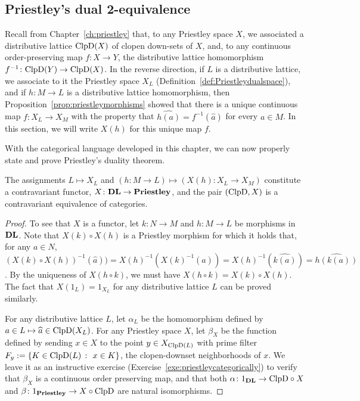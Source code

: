 \subsection*{Priestley's dual 2-equivalence}
Recall from Chapter~\ref{ch:priestley} that, to any Priestley space $X$, we associated a distributive lattice $\mathrm{ClpD}(X)$ of clopen down-sets of $X$, and, to any continuous order-preserving map $f \colon X \to Y$, the distributive lattice homomorphism $f^{-1} \colon \mathrm{ClpD}(Y) \to \mathrm{ClpD}(X)$. In the reverse direction, if $L$ is a distributive lattice, we associate to it the Priestley space $X_L$ (Definition~\ref{def:Priestleydualspace}), and if $h \colon M \to L$ is a distributive lattice homomorphism, then Proposition~\ref{prop:priestleymorphisms} showed that there is a unique continuous map $f \colon X_L \to X_M$ with the property that $\widehat{h(a)} = f^{-1}(\widehat{a})$ for every $a \in M$. In this section, we will write $X(h)$ for this unique map $f$.

With the categorical language developed in this chapter, we can now properly state and prove Priestley's duality theorem. 

\begin{theorem}\label{thm:priestley-duality-long}
The assignments $L \mapsto X_L$ and $(h \colon M \to L) \mapsto (X(h) \colon X_L \to X_M)$ constitute a contravariant functor, $X \colon \mathbf{DL} \to \mathbf{Priestley}$, and the pair $(\mathrm{ClpD}, X)$ is a contravariant equivalence of categories. 
\end{theorem}
\begin{proof}
  To see that $X$ is a functor, let $k \colon N \to M$ and $h \colon M \to L$ be morphisms in $\mathbf{DL}$. Note that $X(k) \circ X(h)$ is a Priestley morphism for which it holds that, for any $a \in N$, $(X(k) \circ X(h))^{-1}(\widehat{a})) = X(h)^{-1}(X(k)^{-1}(\widehat{a})) = X(h)^{-1}(\widehat{k(a)}) = \widehat{h(k(a))}$. By the uniqueness of $X(h \circ k)$, we must have $X(h \circ k) = X(k) \circ X(h)$. The fact that $X(1_L) = 1_{X_L}$ for any distributive lattice $L$ can be proved similarly.

  For any distributive lattice $L$, let $\alpha_L$ be the homomorphism defined by $a \in L \mapsto \widehat{a} \in \mathrm{ClpD}(X_L)$. For any Priestley space $X$, let $\beta_X$ be the function defined by sending $x \in X$ to the point $y \in X_{\mathrm{ClpD}(L)}$ with prime filter $F_y := \{K \in \mathrm{ClpD}(L) \ \colon \ x \in K\}$, the clopen-downset neighborhoods of $x$. We leave it as an instructive exercise (Exercise~\ref{exe:priestleycategorically}) to verify that $\beta_X$ is a continuous order preserving map, and that both $\alpha \colon 1_{\mathbf{DL}} \to \mathrm{ClpD} \circ X$ and $\beta \colon 1_{\mathbf{Priestley}} \to X \circ \mathrm{ClpD}$ are natural isomorphisms.
\end{proof}

